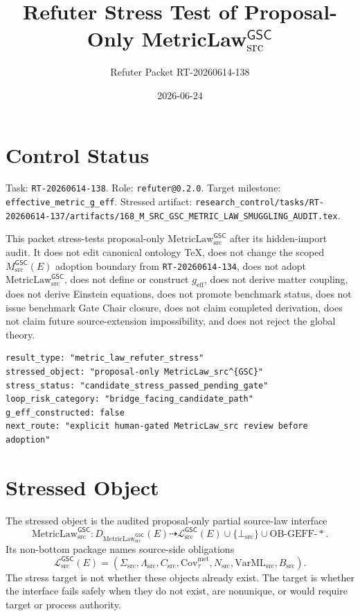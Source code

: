 \documentclass[11pt]{article}
\title{Refuter Stress Test of Proposal-Only MetricLaw\(_{\mathrm{src}}^{\mathsf{GSC}}\)}
\author{Refuter Packet RT-20260614-138}
\date{2026-06-24}
\newcommand{\MsrcGSC}{M_{\mathrm{src}}^{\mathsf{GSC}}}
\newcommand{\MetricLaw}{\mathrm{MetricLaw}_{\mathrm{src}}^{\mathsf{GSC}}}
\newcommand{\MetricData}{\mathcal{L}_{\mathrm{src}}^{\mathsf{GSC}}}
\newcommand{\BottomSrc}{\bot_{\mathrm{src}}}
\newcommand{\geff}{g_{\mathrm{eff}}}
\begin{document}
\maketitle

\section{Control Status}

Task: \texttt{RT-20260614-138}. Role: \texttt{refuter@0.2.0}. Target
milestone: \texttt{effective\_metric\_g\_eff}. Stressed artifact:
\texttt{research\_control/tasks/RT-20260614-137/artifacts/168\_M\_SRC\_GSC\_METRIC\_LAW\_SMUGGLING\_AUDIT.tex}.

This packet stress-tests proposal-only \(\MetricLaw\) after its hidden-import
audit. It does not edit canonical ontology TeX, does not change the scoped
\(\MsrcGSC(E)\) adoption boundary from \texttt{RT-20260614-134}, does not
adopt \(\MetricLaw\), does not define or construct \(\geff\), does not derive
matter coupling, does not derive Einstein equations, does not promote
benchmark status, does not issue benchmark Gate Chair closure, does not claim
completed derivation, does not claim future source-extension impossibility,
and does not reject the global theory.

\begin{verbatim}
result_type: "metric_law_refuter_stress"
stressed_object: "proposal-only MetricLaw_src^{GSC}"
stress_status: "candidate_stress_passed_pending_gate"
loop_risk_category: "bridge_facing_candidate_path"
g_eff_constructed: false
next_route: "explicit human-gated MetricLaw_src review before adoption"
\end{verbatim}

\section{Stressed Object}

The stressed object is the audited proposal-only partial source-law interface
\[
  \MetricLaw:
  D_{\MetricLaw}(E)
  \dashrightarrow
  \MetricData(E)
  \cup
  \{\BottomSrc\}
  \cup
  \mathrm{OB\mbox{-}GEFF\mbox{-}*}.
\]
Its non-bottom package names source-side obligations
\[
  \MetricData(E)
  =
  (
    \Sigma_{\mathrm{src}},
    \Lambda_{\mathrm{src}},
    C_{\mathrm{src}},
    \mathrm{Cov}_{\tau}^{\mathrm{met}},
    N_{\mathrm{src}},
    \mathrm{VarML}_{\mathrm{src}},
    B_{\mathrm{src}}
  ).
\]
The stress target is not whether these objects already exist. The target is
whether the interface fails safely when they do not exist, are nonunique, or
would require target or process authority.
\end{document}
